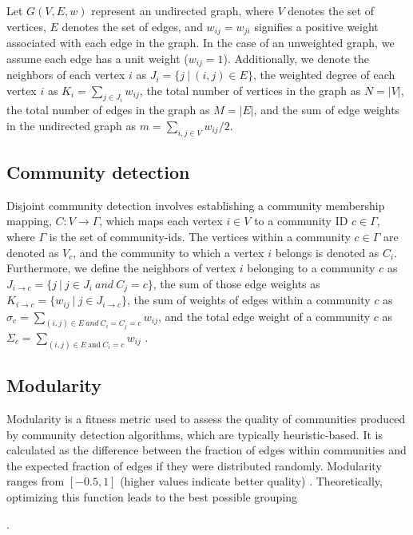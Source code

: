 Let $G(V, E, w)$ represent an undirected graph, where $V$ denotes the set of vertices, $E$ denotes the set of edges, and $w_{ij} = w_{ji}$ signifies a positive weight associated with each edge in the graph. In the case of an unweighted graph, we assume each edge has a unit weight ($w_{ij} = 1$). Additionally, we denote the neighbors of each vertex $i$ as $J_i = \{j\ |\ (i, j) \in E\}$, the weighted degree of each vertex $i$ as $K_i = \sum_{j \in J_i} w_{ij}$, the total number of vertices in the graph as $N = |V|$, the total number of edges in the graph as $M = |E|$, and the sum of edge weights in the undirected graph as $m = \sum_{i, j \in V} w_{ij}/2$.




\subsection{Community detection}

Disjoint community detection involves establishing a community membership mapping, $C: V \rightarrow \Gamma$, which maps each vertex $i \in V$ to a community ID $c \in \Gamma$, where $\Gamma$ is the set of community-ids. The vertices within a community $c \in \Gamma$ are denoted as $V_c$, and the community to which a vertex $i$ belongs is denoted as $C_i$. Furthermore, we define the neighbors of vertex $i$ belonging to a community $c$ as $J_{i \rightarrow c} = \{j\ |\ j \in J_i\ and\ C_j = c\}$, the sum of those edge weights as $K_{i \rightarrow c} = \{w_{ij}\ |\ j \in J_{i \rightarrow c}\}$, the sum of weights of edges within a community $c$ as $\sigma_c = \sum_{(i, j) \in E\ and\ C_i = C_j = c} w_{ij}$, and the total edge weight of a community $c$ as $\Sigma_c = \sum_{(i, j) \in E\ \mbox{and}\ C_i = c} w_{ij}$ \cite{com-zarayeneh21, com-leskovec21}.




\subsection{Modularity}

Modularity is a fitness metric used to assess the quality of communities produced by community detection algorithms, which are typically heuristic-based. It is calculated as the difference between the fraction of edges within communities and the expected fraction of edges if they were distributed randomly. Modularity ranges from $[-0.5, 1]$ (higher values indicate better quality) \cite{com-brandes07}. Theoretically, optimizing this function leads to the best possible grouping \cite{com-newman04, com-traag11}.


